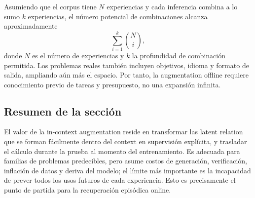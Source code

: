 
Asumiendo que el corpus tiene $N$ experiencias y cada inferencia combina a lo sumo $k$ experiencias, el número potencial de combinaciones alcanza aproximadamente
$$
\sum_{i=1}^{k}\binom{N}{i},
$$
donde $N$ es el número de experiencias y $k$ la profundidad de combinación permitida. Los problemas reales también incluyen objetivos, idioma y formato de salida, ampliando aún más el espacio. Por tanto, la augmentation offline requiere conocimiento previo de tareas y presupuesto, no una expansión infinita.

\subsection{Resumen de la sección}

El valor de la in-context augmentation reside en transformar las latent relation que se forman fácilmente dentro del context en supervisión explícita, y trasladar el cálculo durante la prueba al momento del entrenamiento. Es adecuada para familias de problemas predecibles, pero asume costos de generación, verificación, inflación de datos y deriva del modelo; el límite más importante es la incapacidad de prever todos los usos futuros de cada experiencia. Esto es precisamente el punto de partida para la recuperación episódica online.
